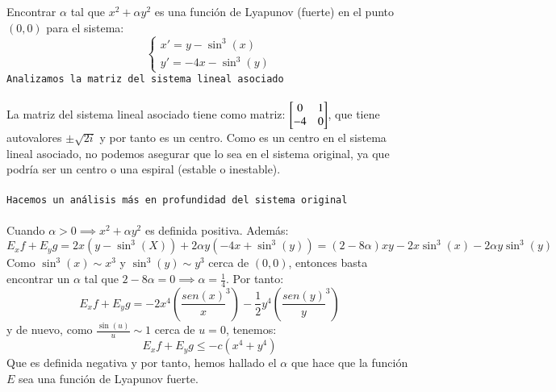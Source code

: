 \begin{eg}
    Encontrar $\alpha$ tal que $x^2 + \alpha y^2$ es una función de Lyapunov (fuerte) en el punto $(0, 0)$ para el sistema:
    $$
        \begin{cases}
            x' = y - \sin^3(x)\\
            y' = -4x -\sin^3(y)
        \end{cases}
    $$
    \texttt{Analizamos la matriz del sistema lineal asociado}\\\\
    La matriz del sistema lineal asociado tiene como matriz: $\mx{0 & 1 \\ -4 & 0}$, que tiene autovalores $\pm \sqrt{2i}$ y por tanto es un centro. Como es un centro en el sistema lineal asociado, no podemos asegurar que lo sea en el sistema original, ya que podría ser un centro o una espiral (estable o inestable).\\\\
    \texttt{Hacemos un análisis más en profundidad del sistema original}\\\\
    Cuando $\alpha > 0 \implies x^2 + \alpha y^2$ es definida positiva. Además:
    $$
        E_x f + E_y g = 2x(y-\sin^3(X)) + 2\alpha y(-4x + \sin^3(y)) = (2 - 8\alpha) xy - 2x \sin^3(x) - 2 \alpha y \sin^3(y)
    $$
    Como $\sin^3(x) \sim x^3$ y $\sin^3(y) \sim y^3$ cerca de $(0,0)$, entonces basta encontrar un $\alpha$ tal que $2 - 8\alpha = 0 \implies \alpha = \frac{1}{4}$. Por tanto:
    $$
        E_x f + E_y g = -2x^4 \left(\frac{sen(x)}{x}^3\right) - \frac{1}{2}y^4 \left(\frac{sen(y)}{y}^3\right)
    $$
    y de nuevo, como $\frac{\sin(u)}{u} \sim 1$ cerca de $u = 0$, tenemos:
    $$
        E_x f + E_y g \leq -c (x^4 + y^4)
    $$
    Que es definida negativa y por tanto, hemos hallado el $\alpha$ que hace que la función $E$ sea una función de Lyapunov fuerte.
\end{eg}
